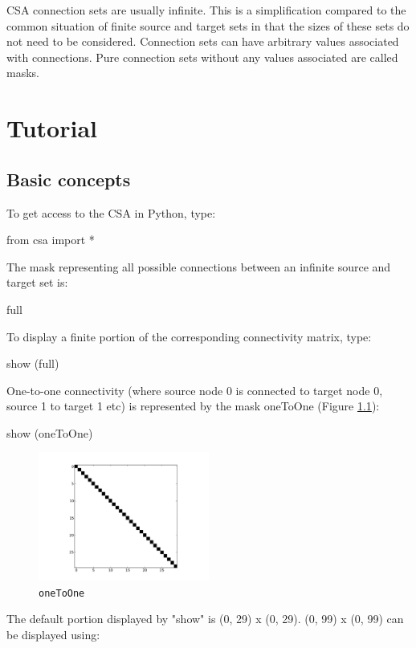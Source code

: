 \documentclass[a4paper,twoside]{report}
\newcommand{\expr}[1]{\lstinline|#1|}
\begin{document}
CSA connection sets are usually infinite.  This is a simplification
compared to the common situation of finite source and target sets in
that the sizes of these sets do not need to be considered.  Connection
sets can have arbitrary values associated with connections.  Pure
connection sets without any values associated are called masks.

\chapter{Tutorial}\label{sec:tutorial}

\section{Basic concepts}

To get access to the CSA in Python, type:

\begin{code}{}
  from csa import *
\end{code}

The mask representing all possible connections between an infinite
source and target set is:

\begin{code}{}
  full
\end{code}

To display a finite portion of the corresponding connectivity matrix,
type:

\begin{code}{}
  show (full)
\end{code}

One-to-one connectivity (where source node 0 is connected to target
node 0, source 1 to target 1 etc) is represented by the mask oneToOne (Figure \ref{fig:oneToOne}):

\begin{code}{}
  show (oneToOne)
\end{code}

\begin{figure}
  \begin{center}
    \includegraphics[width=0.5\textwidth]{figures/oneToOne}
    \caption[oneToOne mask]{\label{fig:oneToOne}
      \expr{oneToOne}
    }
  \end{center}
\end{figure}
\pagebreak
The default portion displayed by "show" is (0, 29) x (0, 29).
(0, 99) x (0, 99) can be displayed using:
\end{document}

